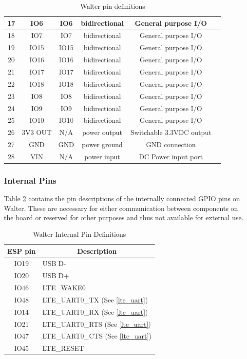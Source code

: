 \documentclass[11pt]{article}
\begin{document}
\begin{table}[!h]
\begin{center}
\begin{tabular}{|c|c|c|c|c|p{9.5cm}|}
\hline
17 & IO6 & IO6 & bidirectional & General purpose I/O \\
\hline
18 & IO7 & IO7 & bidirectional & General purpose I/O \\
\hline
19 & IO15 & IO15 & bidirectional & General purpose I/O \\
\hline
20 & IO16 & IO16 & bidirectional & General purpose I/O \\
\hline
21 & IO17 & IO17 & bidirectional & General purpose I/O \\
\hline
22 & IO18 & IO18 & bidirectional & General purpose I/O \\
\hline
23 & IO8 & IO8 & bidirectional & General purpose I/O \\
\hline
24 & IO9 & IO9 & bidirectional & General purpose I/O \\
\hline
25 & IO10 & IO10 & bidirectional & General purpose I/O \\
\hline
26 & 3V3 OUT & N/A & power output & Switchable 3.3VDC output \\
\hline
27 & GND & GND & power ground & GND connection \\
\hline
28 & VIN & N/A & power input & DC Power input port\\
\hline
\end{tabular}
\caption{\label{table_exteral_pin}Walter pin definitions}
\end{center}
\end{table}
\newpage

\subsubsection{Internal Pins} \label{internal_pins}
Table \ref{table_interal_pin} contains the pin descriptions of the internally connected GPIO pins on Walter. These are necessary for either communication between components on the board or reserved for other purposes and thus not available for external use.

\begin{table}[!h]
    \centering
    \begin{tabular}{|c|p{9.5cm}|}
    \hline
    {\bf ESP pin} & \multicolumn{1}{c|}{\bf Description} \\
    \hline
    \hline
    IO19 & USB D-\\
    \hline
    IO20 & USB D+\\
    \hline
    IO46 & LTE\_WAKE0 \\
    \hline
    IO48 & LTE\_UART0\_TX (See \ref{lte_uart})\\
    \hline
    IO14 & LTE\_UART0\_RX (See \ref{lte_uart})\\
    \hline
    IO21 & LTE\_UART0\_RTS (See \ref{lte_uart})\\
    \hline
    IO47 & LTE\_UART0\_CTS (See \ref{lte_uart})\\
    \hline
    IO45 & LTE\_RESET\\
    \hline
    \end{tabular}
    \caption{\label{table_interal_pin}Walter Internal Pin Definitions}
\end{table}
\end{document}
